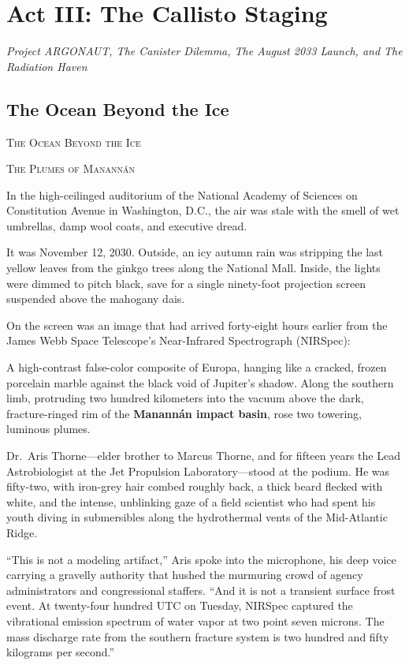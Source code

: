 \documentclass[12pt,twoside,openright]{book}
\newcommand{\sceneheader}[1]{%
  \par\vspace{1.8em}%
  {\noindent\centering\scshape\large #1\par}%
  \vspace{1.0em}%
  \noindent%
}
\begin{document}
\cleardoublepage
\part{Act III: The Callisto Staging}
\begin{center}\large\itshape Project ARGONAUT, The Canister Dilemma, The August 2033 Launch, and The Radiation Haven\end{center}
\vspace*{30pt}
\chapter{The Ocean Beyond the Ice}
\sceneheader{The Ocean Beyond the Ice}

\sceneheader{The Plumes of Manannán}

In the high-ceilinged auditorium of the National Academy of Sciences on
Constitution Avenue in Washington, D.C., the air was stale with the
smell of wet umbrellas, damp wool coats, and executive dread.

It was November 12, 2030. Outside, an icy autumn rain was stripping the
last yellow leaves from the ginkgo trees along the National Mall.
Inside, the lights were dimmed to pitch black, save for a single
ninety-foot projection screen suspended above the mahogany dais.

On the screen was an image that had arrived forty-eight hours earlier
from the James Webb Space Telescope's Near-Infrared Spectrograph
(NIRSpec):

A high-contrast false-color composite of Europa, hanging like a cracked,
frozen porcelain marble against the black void of Jupiter's shadow.
Along the southern limb, protruding two hundred kilometers into the
vacuum above the dark, fracture-ringed rim of the \textbf{Manannán
impact basin}, rose two towering, luminous plumes.

Dr.~Aris Thorne---elder brother to Marcus Thorne, and for fifteen years
the Lead Astrobiologist at the Jet Propulsion Laboratory---stood at the
podium. He was fifty-two, with iron-grey hair combed roughly back, a
thick beard flecked with white, and the intense, unblinking gaze of a
field scientist who had spent his youth diving in submersibles along the
hydrothermal vents of the Mid-Atlantic Ridge.

``This is not a modeling artifact,'' Aris spoke into the microphone, his
deep voice carrying a gravelly authority that hushed the murmuring crowd
of agency administrators and congressional staffers. ``And it is not a
transient surface frost event. At twenty-four hundred UTC on Tuesday,
NIRSpec captured the vibrational emission spectrum of water vapor at two
point seven microns. The mass discharge rate from the southern fracture
system is two hundred and fifty kilograms per second.''
\end{document}
